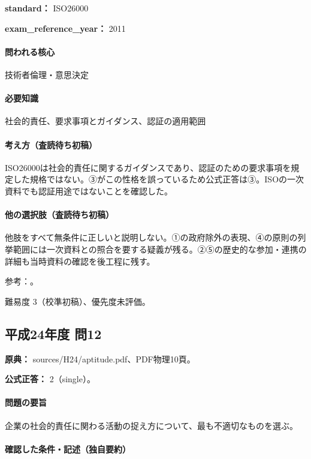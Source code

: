 \noindent\textbf{standard：} ISO26000\par

\noindent\textbf{exam\_reference\_year：} 2011\par

\paragraph{問われる核心} 技術者倫理・意思決定

\paragraph{必要知識} 社会的責任、要求事項とガイダンス、認証の適用範囲

\paragraph{考え方（査読待ち初稿）} ISO26000は社会的責任に関するガイダンスであり、認証のための要求事項を規定した規格ではない。③がこの性格を誤っているため公式正答は③。ISOの一次資料でも認証用途ではないことを確認した。

\paragraph{他の選択肢（査読待ち初稿）} 他肢をすべて無条件に正しいと説明しない。①の政府除外の表現、④の原則の列挙範囲には一次資料との照合を要する疑義が残る。②⑤の歴史的な参加・連携の詳細も当時資料の確認を後工程に残す。

\par 参考：\cite{iso26000}。

\par 難易度 3（校準初稿）、優先度未評価。

\subsection{平成24年度 問12}
\label{q:h24-reg-apt-12}

\noindent\textbf{原典：} sources/H24/aptitude.pdf、PDF物理10頁。

\textbf{公式正答：} 2（single）。

\paragraph{問題の要旨} 企業の社会的責任に関わる活動の捉え方について、最も不適切なものを選ぶ。

\paragraph{確認した条件・記述（独自要約）}\mbox{}\par

